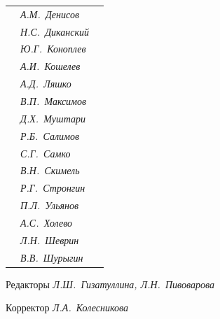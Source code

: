 \begin{tabular}{p{63mm}p{40mm}p{50mm}}
                               &   \it А.М.~Денисов & \\


                               &   \it Н.С.~Диканский & \\


                               &   \it Ю.Г.~Коноплев & \\


                               &   \it А.И.~Кошелев  & \\


                               &   \it А.Д.~Ляшко  & \\


                               &   \it В.П.~Максимов  & \\


                               &   \it Д.Х.~Муштари & \\


                               &   \it Р.Б.~Салимов  & \\


                               &   \it С.Г.~Самко  & \\


                               &   \it В.Н.~Скимель &  \\


                               &   \it Р.Г.~Стронгин  & \\


                               &   \it П.Л.~Ульянов  & \\


                               &   \it А.С.~Холево  & \\


                               &   \it Л.Н.~Шеврин  & \\


                               &   \it В.В.~Шурыгин  & \\


\end{tabular} 


\bigskip 


\bigskip 


\bigskip 





 


\centerline{Редакторы \it Л.Ш.~Гизатуллина, Л.Н.~Пивоварова}


\centerline{Корректор \it Л.А.~Колесникова}


